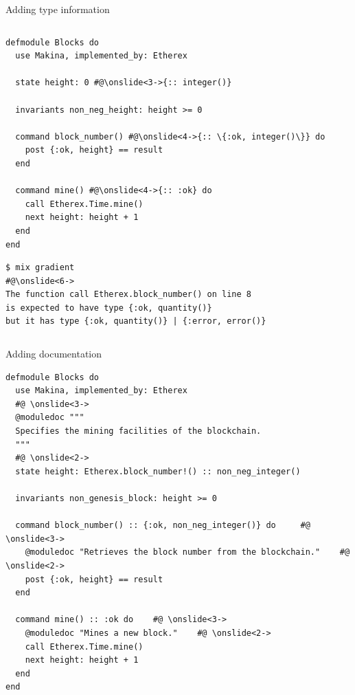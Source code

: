 \documentclass[aspectratio=169, 10pt]{beamer}
\begin{document}
\begin{frame}[label={sec:org644e6e8},fragile]{Adding type information}
 \begin{columns}
\begin{column}{0.58\columnwidth}
\onslide<+->
\onslide<+->
\lstset{language=elixir,label= ,caption= ,captionpos=b,numbers=none,style=display, numbers=left}
\begin{lstlisting}
defmodule Blocks do
  use Makina, implemented_by: Etherex

  state height: 0 #@\onslide<3->{:: integer()}

  invariants non_neg_height: height >= 0

  command block_number() #@\onslide<4->{:: \{:ok, integer()\}} do
    post {:ok, height} == result
  end

  command mine() #@\onslide<4->{:: :ok} do
    call Etherex.Time.mine()
    next height: height + 1
  end
end
\end{lstlisting}
\lstset{language=bash,label= ,caption= ,captionpos=b,numbers=none,style=shell}
\begin{lstlisting}
$ mix gradient
#@\onslide<6->
The function call Etherex.block_number() on line 8
is expected to have type {:ok, quantity()}
but it has type {:ok, quantity()} | {:error, error()}
\end{lstlisting}
\end{column}
\end{columns}
\end{frame}

\begin{frame}[label={sec:org1f2ad73},fragile]{Adding documentation}
 \onslide<+->
\onslide<+->
\lstset{language=elixir,label= ,caption= ,captionpos=b,numbers=none,style=display}
\begin{lstlisting}
defmodule Blocks do
  use Makina, implemented_by: Etherex
  #@ \onslide<3->
  @moduledoc """
  Specifies the mining facilities of the blockchain.
  """
  #@ \onslide<2->
  state height: Etherex.block_number!() :: non_neg_integer()

  invariants non_genesis_block: height >= 0

  command block_number() :: {:ok, non_neg_integer()} do     #@ \onslide<3->
    @moduledoc "Retrieves the block number from the blockchain."    #@ \onslide<2->
    post {:ok, height} == result
  end

  command mine() :: :ok do    #@ \onslide<3->
    @moduledoc "Mines a new block."    #@ \onslide<2->
    call Etherex.Time.mine()
    next height: height + 1
  end
end
\end{lstlisting}
\end{frame}
\end{document}
